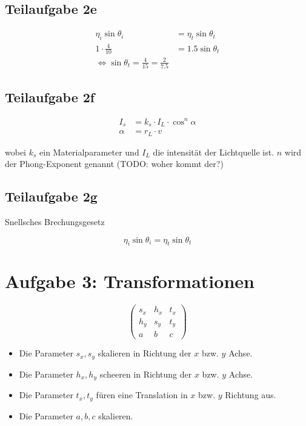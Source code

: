 \documentclass[a4paper]{scrartcl}
\begin{document}
\subsection*{Teilaufgabe 2e}
\begin{align}
    \eta_i \sin \theta_i &= \eta_t \sin \theta_t\\
    1 \cdot \frac{4}{10} &= 1.5 \sin \theta_t\\
    \Leftrightarrow \sin \theta_t = \frac{4}{15} = \frac{2}{7.5}
\end{align}

\subsection*{Teilaufgabe 2f}
\begin{align}
    I_s    &= k_s \cdot I_L \cdot \cos^n \alpha\\
    \alpha &= r_L \cdot v
\end{align}

wobei $k_s$ ein Materialparameter und $I_L$ die intensität der Lichtquelle ist.
$n$ wird der Phong-Exponent genannt (TODO: woher kommt der?)

\subsection*{Teilaufgabe 2g}
Snellsches Brechungsgesetz

\[\eta_i \sin \theta_i = \eta_t \sin \theta_t\]

\section*{Aufgabe 3: Transformationen}
\[\begin{pmatrix}s_x & h_x & t_x\\h_y & s_y & t_y\\a & b & c\end{pmatrix}\]


\begin{itemize}
    \item Die Parameter $s_x, s_y$ skalieren in Richtung der $x$ bzw. $y$
          Achse.
    \item Die Parameter $h_x, h_y$ scheeren in Richtung der $x$ bzw. $y$ Achse.
    \item Die Parameter $t_x, t_y$ füren eine Translation in $x$ bzw. $y$
          Richtung aus.
    \item Die Parameter $a, b, c$ skalieren.
\end{itemize}
\end{document}
